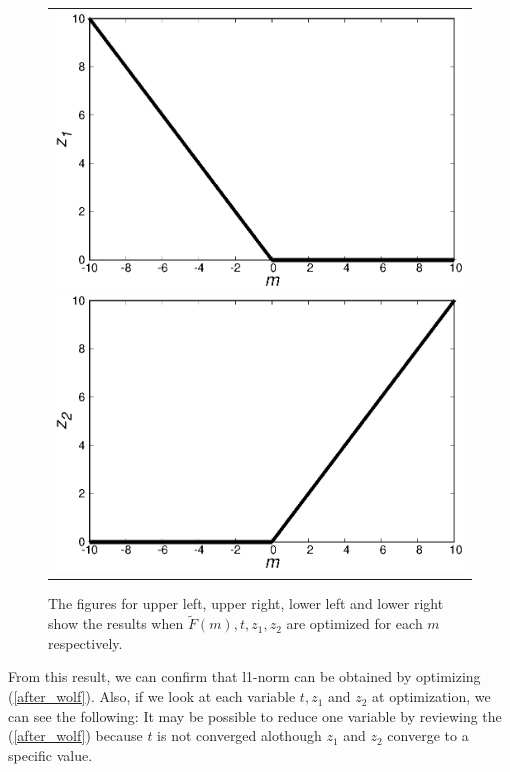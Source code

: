 \documentclass[fp,twocolumn]{jpsj3}
\begin{document}
\begin{figure}[htbp]
\begin{center}
\begin{tabular}{c}
\begin{minipage}{0.50\hsize}
        \includegraphics[keepaspectratio,scale=0.33]{minimum_z1.eps}
      \end{minipage}
      \begin{minipage}{0.50\hsize}
        \centering
        \includegraphics[keepaspectratio,scale=0.33]{minimum_z2.eps}
      \end{minipage}
    \end{tabular}
    \caption{The figures for upper left, upper right, lower left and lower right show the results when $\widetilde{F}(m), t, z_{1}, z_{2}$ are optimized for each $m$ respectively.}
    \label{fig:minimum1}
  \end{center}
\end{figure}

From this result, we can confirm that l1-norm can be obtained by optimizing (\ref{after_wolf}). Also, if we look at each variable $t, z_{1}$ and $z_{2}$ at optimization, we can see the following: It may be possible to reduce one variable by reviewing the (\ref{after_wolf}) because $t$ is not converged alothough $z_{1}$ and $z_{2}$ converge to a specific value.
\end{document}
